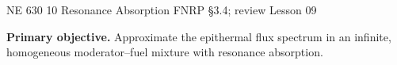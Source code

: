 
\providecommand{\dd}{\,\mathrm{d}}
\usetikzlibrary{arrows.meta}
\setlength{\abovedisplayskip}{4pt plus 1pt minus 1pt}
\setlength{\belowdisplayskip}{4pt plus 1pt minus 1pt}
\setlength{\abovedisplayshortskip}{3pt plus 1pt}
\setlength{\belowdisplayshortskip}{3pt plus 1pt}
\setlength{\jot}{2pt}

\HandoutSetup
  {NE 630}
  {10}
  {Resonance Absorption}
  {FNRP \S3.4; review Lesson 09}


\MakeHandoutTitle

\textcolor{KSUDeepPurple}{\textbf{Primary objective.}}
Approximate the epithermal flux spectrum in an infinite, homogeneous
moderator--fuel mixture with resonance absorption.
\par\vspace{5pt}

